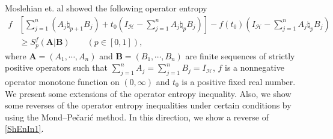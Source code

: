 \documentclass[12pt, reqno]{amsart}
\theoremstyle{definition}
\theoremstyle{remark}
\numberwithin{equation}{section}
\begin{document}
Moslehian et. al \cite{MMM} showed the following operator entropy
\begin{align}\label{ShEnIn1}
f&\left[\sum_{j=1}^n(A_j\natural_{p+1}B_j)+t_0\left(I_{\mathscr H}-\sum_{j=1}^nA_j\natural_pB_j\right)\right]-f(t_0)\left(I_{\mathscr H}-\sum_{j=1}^nA_j\natural_pB_j\right)\nonumber\\
&\ge S_p^f(\mathbf{A}|\mathbf{B})\qquad(p\in[0,1]),
\end{align}
where $\mathbf{A}=(A_1,\cdots,A_n)$ and $\mathbf{B}=(B_1,\cdots,B_n)$ are finite sequences of strictly positive operators such that $\sum_{j=1}^nA_j=\sum_{j=1}^nB_j=I_{\mathscr H}$,  $f$ is a nonnegative operator monotone function on $(0,\infty)$ and $t_0$ is a positive fixed real number.\\

We present some extensions of the operator entropy inequality. Also, we show some reverses of the operator entropy inequalities under certain conditions by using the Mond--Pe\v{c}ari\'c method. In this direction, we show a reverse of \eqref{ShEnIn1}.
\end{document}
